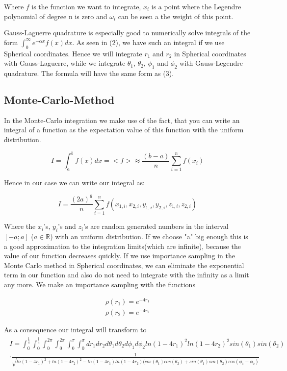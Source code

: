 \documentclass[10pt,a4paper]{article}
\begin{document}
Where $f$ is the function we want to integrate, $x_i$ is a point where the Legendre polynomial of degree n is zero and $\omega_i$ can be seen a the weight of this point.

Gauss-Laguerre quadrature is especially good to numerically solve integrals of the form $\int_{0}^{\infty} e^{-\alpha x} f(x) dx$. As seen in (2), we have such an integral if we use Spherical coordinates. Hence we will integrate $r_1$ and $r_2$ in Spherical coordinates with Gauss-Laguerre, while we integrate $\theta_1$, $\theta_2$, $\phi_1$ and $\phi_2$ with Gauss-Legendre quadrature. The formula will have the same form as (3).

\subsection{Monte-Carlo-Method} 

In the Monte-Carlo integration we make use of the fact, that you can write an integral of a function as the expectation value of this function with the uniform distribution.

\begin{equation}
	I = \int_{a}^{b} f(x) dx = <f> \approx \frac{(b-a)}{n} \sum_{i=1}^{n} f(x_i)
\end{equation}

Hence in our case we can write our integral as:

\begin{equation}
	I = \frac{(2a)^6}{n} \sum_{i = 1}^n f(x_{1,i}, x_{2,i}, y_{1,i}, y_{2,i}, z_{1,i}, z_{2,i})
\end{equation}

Where the $x_i$'s, $y_i$'s and $z_i$'s are random generated numbers in the interval $[-a;a]$ ($a \in \mathbb{R}$) with an uniform distribution. If we choose "a" big enough this is a good approximation to the integration limits(which are infinite), because the value of our function decreases quickly. 
If we use importance sampling in the Monte Carlo method in Spherical coordinates, we can eliminate the exponential term in our function and also do not need to integrate with the infinity as a limit any more. We make an importance sampling with the functions

\begin{align}
	\rho(r_1) = e^{-4 r_1} \\\rho(r_2) = e^{-4 r_2}
\end{align}

As a consequence our integral will transform to 
\begin{align}
	\begin{split}
		I = \int_0^\frac{1}{4} \int_0^\frac{1}{4}  \int_0^{2 \pi} \int_0^{2 \pi}  \int_0^\pi \int_0^\pi dr_1 dr_2 d\theta_1 d\theta_2 d\phi_1 d\phi_2    ln(1-4 r_1)^2 ln(1-4 r_2)^2 sin(\theta_1) sin(\theta_2)\\ \cdot \frac{1} {\sqrt{ln(1-4 r_1)^2+ln(1-4 r_2)^2-ln(1-4 r_1)ln(1-4 r_2)(cos(\theta_1)cos(\theta_2)+sin(\theta_1)sin(\theta_2)cos(\phi_1-\phi_2)}}
	\end{split}
\end{align}
\end{document}
